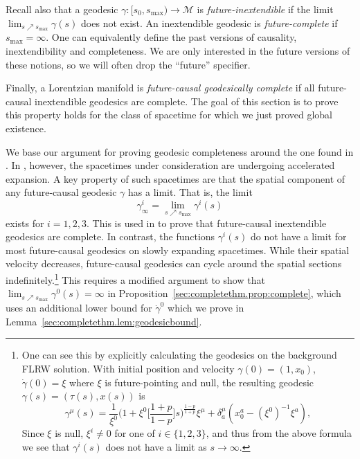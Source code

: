 \documentclass{article}
\newcommand{\mc}{\mathcal}
\newcommand{\ra}{\rightarrow}
\begin{document}
Recall also that a geodesic $\gamma:[s_0,s_{\max}) \ra \mc{M}$ is \emph{future-inextendible} if the limit $\lim_{s \nearrow s_{\max}}\gamma(s)$ does not exist. An inextendible geodesic is \emph{future-complete} if $s_{\max} = \infty$. One can equivalently define the past versions of causality, inextendibility and completeness. We are only interested in the future versions of these notions, so we will often drop the ``future'' specifier.

Finally, a Lorentzian manifold is \emph{future-causal geodesically complete} if all future-causal inextendible geodesics are complete. The goal of this section is to prove this property holds for the class of spacetime for which we just proved global existence. 

\begin{remark}
We base our argument for proving geodesic completeness around the one found in \cite{Rin:powerlaw:09}. In \cite{Rin:powerlaw:09}, however, the spacetimes under consideration are undergoing accelerated expansion. A key property of such spacetimes are that the spatial component of any future-causal geodesic $\gamma$ has a limit. That is, the limit
\begin{equation}
    \gamma_\infty^i = \lim_{s \nearrow s_{\max}}\gamma^i(s)
\end{equation}
exists for $i = 1,2,3$. This is used in \cite{Rin:powerlaw:09} to prove that future-causal inextendible geodesics are complete. In contrast, the functions $\gamma^i(s)$ do not have a limit for most future-causal geodesics on slowly expanding spacetimes.
While their spatial velocity decreases, future-causal geodesics can cycle around the spatial sections indefinitely.\footnote{One can see this by explicitly calculating the geodesics on the background FLRW solution. With initial position and velocity $\gamma(0) = (1,x_0)$, $\dot{\gamma}(0) = \xi$ where $\xi$ is future-pointing and null, the resulting geodesic $\gamma(s) = (\tau(s),x(s))$ is
\begin{equation*}
    \gamma^\mu(s) = \frac{1}{\xi^0}\Big(1+\xi^0\big[\frac{1+p}{1-p}\big]s\Big)^{\frac{1-p}{1+p}}\xi^\mu + \delta_{a}^\mu (x_0^a-(\xi^0)^{-1}\xi^a),
\end{equation*}
Since $\xi$ is null, $\xi^i \neq 0$ for one of $i \in \{1,2,3\}$, and thus from the above formula we see that $\gamma^i(s)$ does not have a limit as $s \ra \infty$.} This requires a modified argument to show that $\lim_{s \nearrow s_{\max}} \gamma^0(s) = \infty$ in Proposition~\ref{sec:completethm.prop:complete}, which uses an additional lower bound for $\dot{\gamma}^0$ which we prove in Lemma~\ref{sec:completethm.lem:geodesicbound}.
\end{remark}
\end{document}
